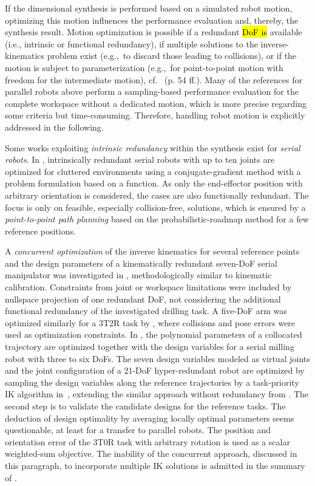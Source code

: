 If the dimensional synthesis is performed based on a simulated robot motion, optimizing this motion influences the performance evaluation and, thereby, the synthesis result.
Motion optimization is possible if {a} redundant \hl{DoF is} %
available (i.e., intrinsic or functional redundancy), if multiple solutions to the inverse-kinematics problem exist (e.g.,~to discard those leading to collisions), or if the motion is subject to parameterization (e.g.,~for point-to-point motion with freedom for the intermediate motion), cf.~\cite{Brandstoetter2016} (p. 54 ff.).
Many of the references for parallel robots above perform a sampling-based performance evaluation for the complete workspace without a dedicated motion, which is more precise regarding some criteria but time-consuming.
Therefore, handling robot motion is explicitly addressed in the following.

Some works exploiting \emph{intrinsic redundancy} within the synthesis exist for \emph{serial robots}.
%
%
In \cite{SinglaTriRakDas2010}, intrinsically redundant serial robots with up to ten joints are optimized for cluttered environments using a conjugate-gradient method with a problem formulation based on a  function.
As only the end-effector position {with} arbitrary orientation is considered, the cases are also functionally redundant.
The focus is only on feasible, especially collision-free, solutions, which is ensured by a \emph{point-to-point path planning} based on the %
probabilistic-roadmap method for a few reference positions.

A \emph{concurrent optimization} of the inverse kinematics for several reference points and the design parameters of a kinematically redundant seven-DoF {serial} manipulator was investigated in \cite{KivelaeMatPuu2017}, methodologically similar to kinematic calibration.
%
Constraints from joint or workspace limitations were included by nullspace projection of one redundant DoF, not considering the additional functional redundancy of the investigated drilling task.
A five-DoF arm was optimized similarly for a 3T2R task by \cite{WhitmanCho2018}, where collisions and pose errors were used as optimization constraints.
In \cite{BaumgaertnerKanFle2023}, the polynomial parameters of a collocated trajectory are optimized together with the design variables for a serial milling robot with three to six DoFs.
The seven design variables modeled as virtual joints and the joint configuration of a 21-DoF hyper-redundant robot are optimized by sampling the design variables along the reference trajectories by a task-priority IK algorithm in~\cite{GinnanteSimCarLeb2023}, extending the similar approach without redundancy from \cite{MaaroofDedAyd2022}.
The second step is to validate the candidate designs for the reference tasks.
The deduction of design optimality by averaging locally optimal parameters seems questionable, at least for a transfer to parallel robots.
The position and orientation error of the 3T0R task with arbitrary rotation is used as a scalar weighted-sum objective.
The inability of the concurrent approach, discussed in this paragraph, to incorporate multiple IK solutions is admitted in the summary of \cite{WhitmanCho2018}.

